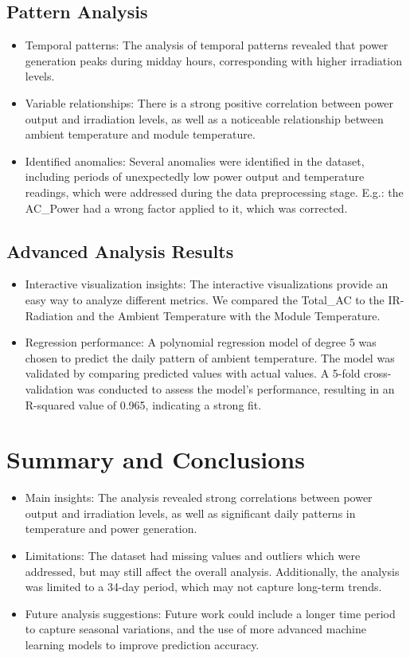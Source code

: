 \documentclass[10pt]{article}
\begin{document}
\subsection{Pattern Analysis}
\begin{itemize}
    \item Temporal patterns: The analysis of temporal patterns revealed that power generation peaks during midday hours, corresponding with higher irradiation levels.
    \item Variable relationships: There is a strong positive correlation between power output and irradiation levels, as well as a noticeable relationship between ambient temperature and module temperature.
    \item Identified anomalies: Several anomalies were identified in the dataset, including periods of unexpectedly low power output and temperature readings, which were addressed during the data preprocessing stage. E.g.: the AC\_Power had a wrong factor applied to it, which was corrected.
\end{itemize}

\subsection{Advanced Analysis Results}
\begin{itemize}
    \item Interactive visualization insights: The interactive visualizations provide an easy way to analyze different metrics. We compared the Total\_AC to the IR-Radiation and the Ambient Temperature with the Module Temperature.
    \item Regression performance: A polynomial regression model of degree 5 was chosen to predict the daily pattern of ambient temperature. The model was validated by comparing predicted values with actual values. A 5-fold cross-validation was conducted to assess the model's performance, resulting in an R-squared value of 0.965, indicating a strong fit.
\end{itemize}

\section{Summary and Conclusions}
\begin{itemize}
    \item Main insights: The analysis revealed strong correlations between power output and irradiation levels, as well as significant daily patterns in temperature and power generation.
    \item Limitations: The dataset had missing values and outliers which were addressed, but may still affect the overall analysis. Additionally, the analysis was limited to a 34-day period, which may not capture long-term trends.
    \item Future analysis suggestions: Future work could include a longer time period to capture seasonal variations, and the use of more advanced machine learning models to improve prediction accuracy.
\end{itemize}

\end{document}
